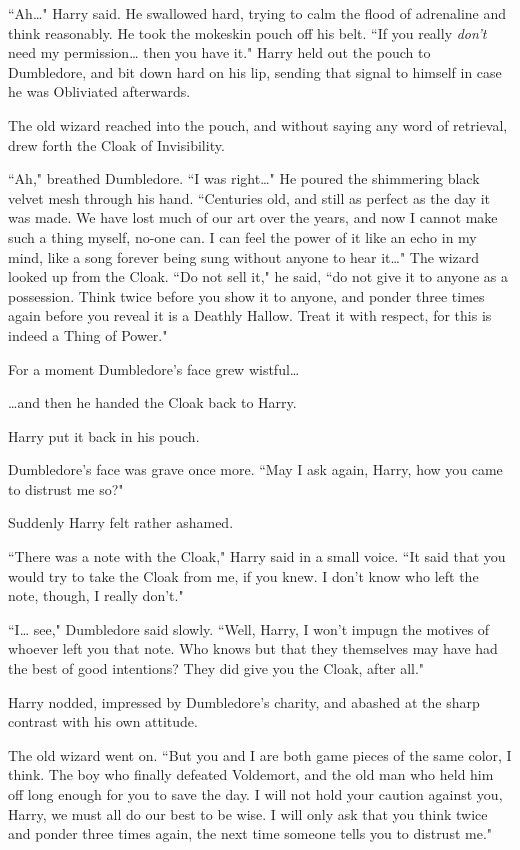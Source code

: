``Ah{\ldots}" Harry said. He swallowed hard, trying to calm the flood of adrenaline and think reasonably. He took the mokeskin pouch off his belt. ``If you really \emph{don't} need my permission{\ldots} then you have it." Harry held out the pouch to Dumbledore, and bit down hard on his lip, sending that signal to himself in case he was Obliviated afterwards.

The old wizard reached into the pouch, and without saying any word of retrieval, drew forth the Cloak of Invisibility.

``Ah," breathed Dumbledore. ``I was right{\ldots}" He poured the shimmering black velvet mesh through his hand. ``Centuries old, and still as perfect as the day it was made. We have lost much of our art over the years, and now I cannot make such a thing myself, no-one can. I can feel the power of it like an echo in my mind, like a song forever being sung without anyone to hear it{\ldots}" The wizard looked up from the Cloak. ``Do not sell it," he said, ``do not give it to anyone as a possession. Think twice before you show it to anyone, and ponder three times again before you reveal it is a Deathly Hallow. Treat it with respect, for this is indeed a Thing of Power."

For a moment Dumbledore's face grew wistful{\ldots}

{\ldots}and then he handed the Cloak back to Harry.

Harry put it back in his pouch.

Dumbledore's face was grave once more. ``May I ask again, Harry, how you came to distrust me so?"

Suddenly Harry felt rather ashamed.

``There was a note with the Cloak," Harry said in a small voice. ``It said that you would try to take the Cloak from me, if you knew. I don't know who left the note, though, I really don't."

``I{\ldots} see," Dumbledore said slowly. ``Well, Harry, I won't impugn the motives of whoever left you that note. Who knows but that they themselves may have had the best of good intentions? They did give you the Cloak, after all."

Harry nodded, impressed by Dumbledore's charity, and abashed at the sharp contrast with his own attitude.

The old wizard went on. ``But you and I are both game pieces of the same color, I think. The boy who finally defeated Voldemort, and the old man who held him off long enough for you to save the day. I will not hold your caution against you, Harry, we must all do our best to be wise. I will only ask that you think twice and ponder three times again, the next time someone tells you to distrust me."

